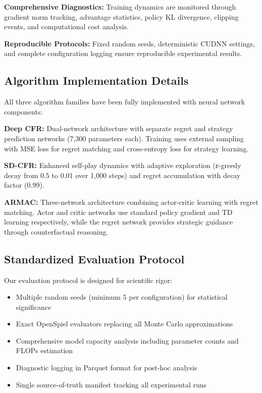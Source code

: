 \documentclass[10pt,twocolumn,conference]{IEEEtran}
\begin{document}
\textbf{Comprehensive Diagnostics:} Training dynamics are monitored through gradient norm tracking, advantage statistics, policy KL divergence, clipping events, and computational cost analysis.

\textbf{Reproducible Protocols:} Fixed random seeds, deterministic CUDNN settings, and complete configuration logging ensure reproducible experimental results.

\subsection{Algorithm Implementation Details}
All three algorithm families have been fully implemented with neural network components:

\textbf{Deep CFR:} Dual-network architecture with separate regret and strategy prediction networks (7,300 parameters each). Training uses external sampling with MSE loss for regret matching and cross-entropy loss for strategy learning.

\textbf{SD-CFR:} Enhanced self-play dynamics with adaptive exploration (ε-greedy decay from 0.5 to 0.01 over 1,000 steps) and regret accumulation with decay factor (0.99).

\textbf{ARMAC:} Three-network architecture combining actor-critic learning with regret matching. Actor and critic networks use standard policy gradient and TD learning respectively, while the regret network provides strategic guidance through counterfactual reasoning.

\subsection{Standardized Evaluation Protocol}
Our evaluation protocol is designed for scientific rigor:

\begin{itemize}
    \item Multiple random seeds (minimum 5 per configuration) for statistical significance
    \item Exact OpenSpiel evaluators replacing all Monte Carlo approximations
    \item Comprehensive model capacity analysis including parameter counts and FLOPs estimation
    \item Diagnostic logging in Parquet format for post-hoc analysis
    \item Single source-of-truth manifest tracking all experimental runs
\end{itemize}
\end{document}
